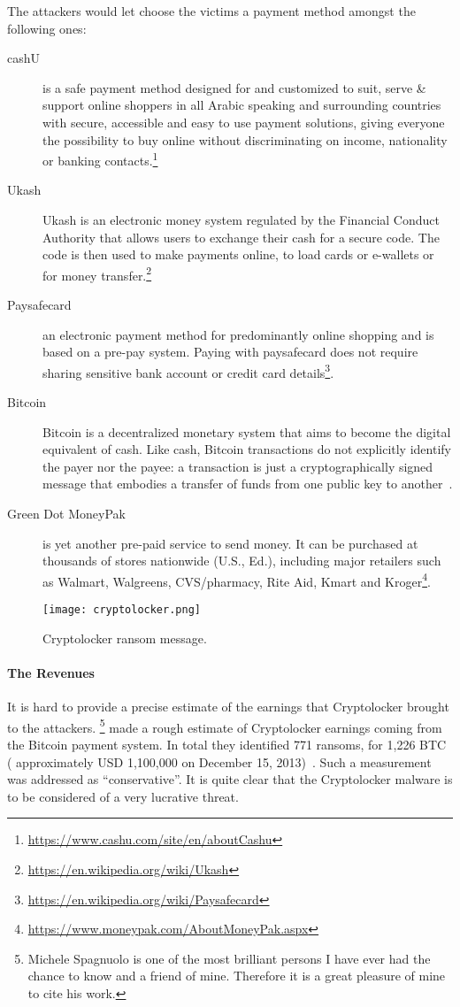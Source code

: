 The attackers would let choose the victims a payment method amongst the following
ones:
\begin{description}
    \item[cashU] is a safe payment method designed for and customized to suit,
    serve \& support online shoppers in all Arabic speaking and surrounding countries
    with secure, accessible and easy to use payment solutions, giving everyone the
    possibility to buy online without discriminating on income, nationality or
    banking contacts.\footnote{\url{https://www.cashu.com/site/en/aboutCashu}}
    \item[Ukash] Ukash is an electronic money system regulated by the Financial
        Conduct Authority that allows users to exchange their cash for a secure
        code. The code is then used to make payments online, to load cards or
        e-wallets or for  money transfer.\footnote{\url{https://en.wikipedia.org/wiki/Ukash}}
    \item [Paysafecard] an electronic payment method for predominantly online
        shopping and is based on a pre-pay system. Paying with paysafecard does not
        require sharing sensitive bank account or credit card
        details\footnote{\url{https://en.wikipedia.org/wiki/Paysafecard}}.
    \item[Bitcoin] Bitcoin is a decentralized monetary system that aims to become
        the digital equivalent of cash. Like cash, Bitcoin transactions do not
        explicitly identify the payer nor the payee: a transaction is just a
        cryptographically signed message that embodies a transfer of funds from one
        public key to another~\cite{spagnuolo2013}.
    \item[Green Dot MoneyPak] is yet another pre-paid service to send money. It
        can be purchased at thousands of stores nationwide (U.S., Ed.), including major retailers such as Walmart, Walgreens, CVS/pharmacy, Rite Aid, Kmart and Kroger\footnote{\url{https://www.moneypak.com/AboutMoneyPak.aspx}}.
\end{description}

\begin{figure}[!htp]
    \centering
    \texttt{[image: cryptolocker.png]}
    \caption{Cryptolocker ransom message.}
    \label{fig:crypto_ransom}
\end{figure}

\paragraph{The Revenues} It is hard to provide a precise estimate of the
earnings that Cryptolocker brought to the attackers. \citeauthor{spagnuolo2013}
\footnote{Michele Spagnuolo is one of the most brilliant persons I have ever had
the chance to know and a friend of mine. Therefore it is a great pleasure of mine to cite
his work.} made a rough estimate of Cryptolocker earnings coming from the
Bitcoin payment system. In total they identified 771 ransoms, for 1,226 BTC (
approximately USD 1,100,000 on December 15, 2013)~\cite{spagnuolo2013}. Such a
measurement was addressed as ``conservative''. It is quite clear that the
Cryptolocker malware is to be considered of a very lucrative threat.


